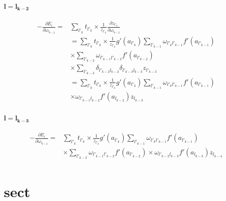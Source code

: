 \documentclass[final, paper=letter,5p,times,twocolumn]{elsarticle}
\begin{document}
\paragraph{$\bm{l = l_{k-2}}$}{

  \begin{equation*}
    \begin{split}
      - \frac{\partial E_{i}}{\partial \omega_{l_{k-2}}} = & \sum_{l'_{k}} t_{l'_{k}} \times \frac{1}{z_{l'_{k}}} \frac{\partial z_{l'_{k}}}{\partial \omega_{l_{k-2}}}\\
      & = \sum_{l'_{k}} t_{l'_{k}} \times \frac{1}{z_{l'_{k}}} g'(a_{l'_{k}})  \sum_{l'_{k-1}} \omega_{l'_{k}l'_{k-1}} f'(a_{l'_{k-1}}) \\
      & \times \sum_{l'_{k-2}} \omega_{l'_{k-1}l'_{k-2}} f'(a_{l'_{k-2}}) \\
      & \times \sum_{l'_{k-3}} \delta_{l'_{k-2}l_{k-2}} \delta_{l'_{k-3}l_{k-3}} z_{l'_{k-3}}  \\
      & = \sum_{l'_{k}} t_{l'_{k}} \times \frac{1}{z_{l'_{k}}} g'(a_{l'_{k}})  \sum_{l'_{k-1}} \omega_{l'_{k}l'_{k-1}} f'(a_{l'_{k-1}}) \\
      & \times \omega_{l'_{k-1}l_{k-2}} f'(a_{l_{k-2}})  z_{l_{k-3}}  \\
    \end{split}
\end{equation*}

}

\paragraph{$\bm{l = l_{k-3}}$}{

  \begin{equation*}
    \begin{split}
      - \frac{\partial E_{i}}{\partial \omega_{l_{k-2}}} = & \sum_{l'_{k}} t_{l'_{k}} \times \frac{1}{z_{l'_{k}}} g'(a_{l'_{k}})  \sum_{l'_{k-1}} \omega_{l'_{k}l'_{k-1}} f'(a_{l'_{k-1}}) \\
      & \times \sum_{l'_{k-2}} \omega_{l'_{k-1}l'_{k-2}} f'(a_{l'_{k-2}}) \times \omega_{l'_{k-2}l_{k-3}} f'(a_{l_{k-3}}) z_{l_{k-4}}  \\
    \end{split}
\end{equation*}

}

\section{sect}
\end{document}
